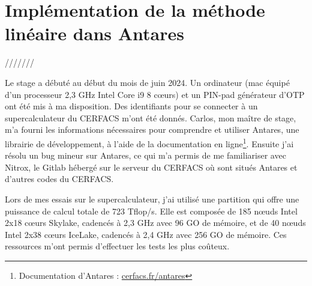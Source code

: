 \chapter{Implémentation de la méthode linéaire dans Antares}

///////\cite{alexis}




Le stage a débuté au début du mois de juin 2024. Un ordinateur (mac équipé d'un processeur 2,3 GHz Intel Core i9 8 cœurs) et un PIN-pad générateur d'\ac{OTP} ont été mis à ma disposition. Des identifiants pour se connecter à un supercalculateur du CERFACS m'ont été donnés. Carlos, mon maître de stage, m'a fourni les informations nécessaires pour comprendre et utiliser Antares\cite{antares}, une librairie de développement, à l'aide de la documentation en ligne\footnote{Documentation d'Antares : \href{https://cerfacs.fr/antares/}{cerfacs.fr/antares}}. Ensuite j'ai résolu un bug mineur sur Antares, ce qui m'a permis de me familiariser avec Nitrox, le Gitlab hébergé sur le serveur du CERFACS où sont situés Antares et d'autres codes du CERFACS.

Lors de mes essais sur le supercalculateur, j'ai utilisé une partition qui offre une puissance de calcul totale de 723 Tflop/s. Elle est composée de 185 nœuds Intel 2x18 cœurs Skylake, cadencés à 2,3 GHz avec 96 GO de mémoire, et de 40 nœuds Intel 2x38 cœurs IceLake, cadencés à 2,4 GHz avec 256 GO de mémoire. Ces ressources m'ont permis d'effectuer les tests les plus coûteux.

